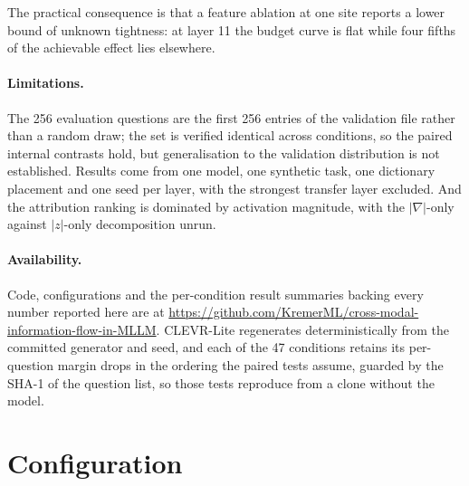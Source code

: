 \documentclass[11pt,a4paper]{article}
\begin{document}
The practical consequence is that a feature ablation at one site reports a
lower bound of unknown tightness: at layer 11 the budget curve is flat while
four fifths of the achievable effect lies elsewhere.

\paragraph{Limitations.} The 256 evaluation questions are the first 256 entries of the validation file
rather than a random draw; the set is verified identical across conditions, so
the paired internal contrasts hold, but generalisation to the validation
distribution is not established. Results come from one model, one synthetic task, one dictionary placement and
one seed per layer, with the strongest transfer layer excluded. And the attribution ranking is dominated by activation magnitude, with the
$|\nabla|$-only against $|z|$-only decomposition unrun.

\paragraph{Availability.} Code, configurations and the per-condition result
summaries backing every number reported here are at
\url{https://github.com/KremerML/cross-modal-information-flow-in-MLLM}. CLEVR-Lite
regenerates deterministically from the committed generator and seed, and each of
the 47 conditions retains its per-question margin drops in the ordering the
paired tests assume, guarded by the SHA-1 of the question list, so those tests
reproduce from a clone without the model.

\appendix
\section{Configuration}
\end{document}
